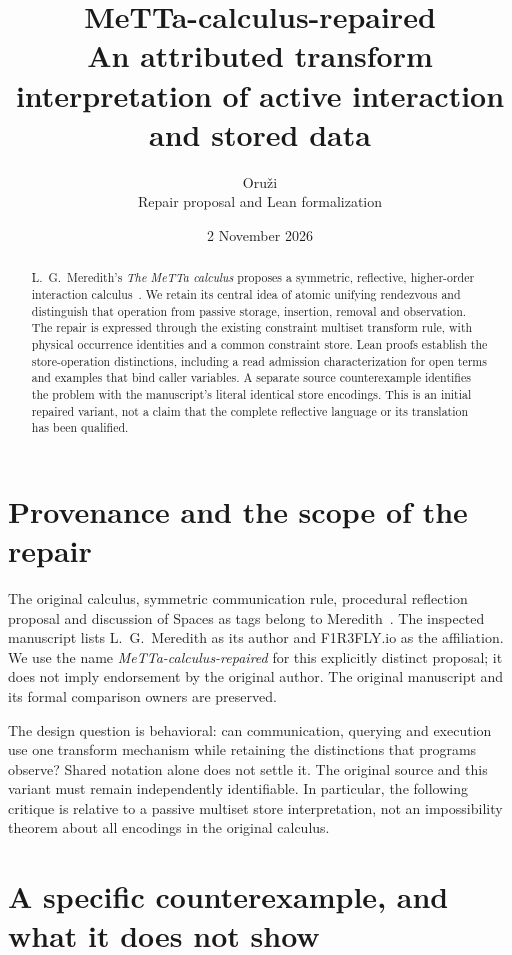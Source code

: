 \documentclass[11pt]{article}
\title{MeTTa-calculus-repaired\\
\large An attributed transform interpretation of active interaction and stored data}
\author{Oru\v{z}i\\\small Repair proposal and Lean formalization}
\date{2 November 2026}
\begin{document}
\maketitle

\begin{abstract}
L.~G.~Meredith's \emph{The MeTTa calculus} proposes a symmetric,
reflective, higher-order interaction calculus~\cite{meredith}.
We retain its central idea of atomic unifying rendezvous and distinguish
that operation from passive storage, insertion, removal and observation.
The repair is expressed through the existing constraint multiset transform
rule, with physical occurrence identities and a common constraint store.
Lean proofs establish the store-operation distinctions, including a read
admission characterization for open terms and examples that bind caller
variables. A separate source counterexample identifies the problem with
the manuscript's literal identical store encodings. This is an initial
repaired variant, not a claim that the complete reflective language or its
translation has been qualified.
\end{abstract}

\section{Provenance and the scope of the repair}

The original calculus, symmetric communication rule, procedural reflection
proposal and discussion of Spaces as tags belong to Meredith~\cite{meredith}.
The inspected manuscript lists L.~G.~Meredith as its author and F1R3FLY.io
as the affiliation. We use the name \emph{MeTTa-calculus-repaired} for this
explicitly distinct proposal; it does not imply endorsement by the original
author. The original manuscript and its formal comparison owners are
preserved.

The design question is behavioral: can communication, querying and execution
use one transform mechanism while retaining the distinctions that programs
observe? Shared notation alone does not settle it. The original source and
this variant must remain independently identifiable. In particular, the
following critique is relative to a passive multiset store interpretation,
not an impossibility theorem about all encodings in the original calculus.

\section{A specific counterexample, and what it does not show}
\end{document}
